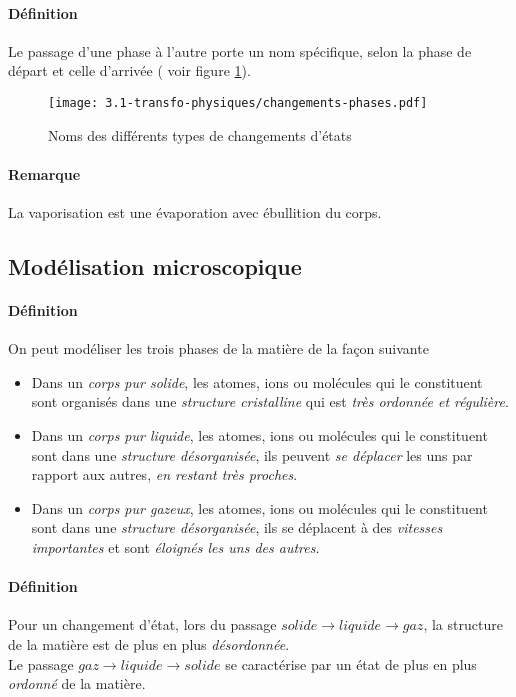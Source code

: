 \paragraph{Définition} Le passage d'une phase à l'autre porte un nom spécifique, 
selon la phase de départ et celle d'arrivée ( voir figure \ref{fig:nom_changements_etats}).
\begin{figure}[!h]
  \begin{center}
      \texttt{[image: 3.1-transfo-physiques/changements-phases.pdf]}
  \end{center}
  \caption{Noms des différents types de changements d'états}
  \label{fig:nom_changements_etats}
\end{figure}

\paragraph{Remarque} La vaporisation est une évaporation avec ébullition du corps.

\subsection{Modélisation microscopique}
\paragraph{Définition} On peut modéliser les trois phases de la matière de la façon suivante
\begin{itemize}
  \item  Dans un \textit{corps pur solide}, les atomes, ions ou  molécules qui le constituent sont 
  organisés dans une \textit{structure cristalline} qui est \textit{très ordonnée et régulière}.
 
  \item Dans un \textit{corps pur liquide}, les atomes, ions ou  molécules qui le constituent 
  sont dans une \textit{structure désorganisée}, ils peuvent \textit{se déplacer}
  les uns par rapport aux autres, \textit{en restant très proches}.

  \item Dans un \textit{corps pur gazeux}, les atomes, ions ou  molécules qui le constituent 
  sont dans une \textit{structure désorganisée}, ils se déplacent à des \textit{vitesses
  importantes} et sont \textit{éloignés les uns des autres}.
\end{itemize}

\paragraph{Définition} Pour un changement d'état, lors du passage 
$solide \rightarrow liquide \rightarrow gaz$, la structure de la matière 
est de plus en plus \textit{désordonnée}.\\
Le passage $gaz \rightarrow liquide\rightarrow solide$ se caractérise par un état de plus en plus 
\textit{ordonné} de la matière.

